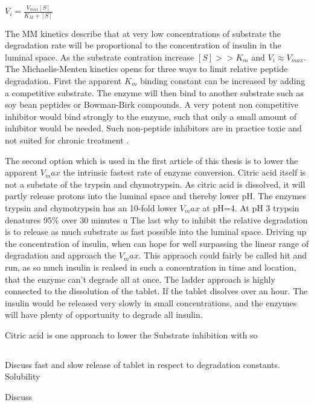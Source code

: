 $V_i = \frac{V_{max} [S]}{K_{M}+[S]}$

The MM kinetics describe that at very low concentrations of substrate the degradation rate will be proportional to the concentration of insulin in the luminal space. As the substrate contration increase $[S] >> K_m$ and $V_i \approx V_{max}$. 
The Michaelis-Menten kinetics opens for three ways to limit relative peptide degradation. First the apparent $K_m$ binding constant can be increased by adding a competitive substrate. The enzyme will then bind to another substrate such as soy bean peptides or Bowman-Birk compounds. A very potent non competitive inhibitor would bind strongly to the enzyme, such that only a small amount of inhibitor would be needed. Such non-peptide inhibitors are in practice toxic and not suited for chronic treatment \cite{bernkop1998use} \cite{murthy1980effect}. 

The second option which is used in the first article \cite{welling2014citric} of this thesis is to lower the apparent $V_max$ the intrinsic fastest rate of enzyme conversion. Citric acid itself is not a substate of the trypsin and chymotrypsin. As citric acid is dissolved, it will partly release protons into the luminal space and thereby lower pH. The enzymes trypsin and chymotrypsin has an 10-fold lower $V_max$ at pH=4. At pH 3 trypsin denatures 95\% over 30 minutes u The last why to inhibit the relative degradation is to release as much substrate as fast possible into the luminal space. Driving up the concentration of insulin, when can hope for well surpassing the linear range of degradation and approach the $V_max$. This appraoch could fairly be called hit and run, as so much insulin is realsed in such a concentration in time and location, that the enzyme can't degrade all at once. The ladder approach is highly connected to the dissolution of the tablet. If the tablet disolves over an hour. The insulin would be released very slowly in small concentrations, and the enzymes will have plenty of opportunity to degrade all insulin.

Citric acid is one approach to lower the 
Substrate inhibition with so


\subsection{}

\newpage




Discuss fast and slow release of tablet in respect to degradation constants. Solubility

Discuss 
